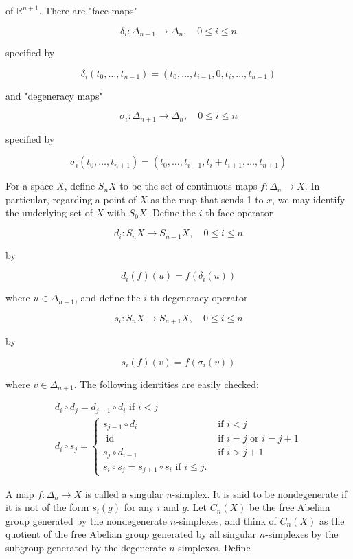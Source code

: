 of $\mathbb{R}^{n+1}$. There are "face maps"

$$
\delta_i: \Delta_{n-1} \longrightarrow \Delta_n, \quad 0 \leq i \leq n
$$

specified by

$$
\delta_i\left(t_0, \ldots, t_{n-1}\right)=\left(t_0, \ldots, t_{i-1}, 0, t_i, \ldots, t_{n-1}\right)
$$

and "degeneracy maps"

$$
\sigma_i: \Delta_{n+1} \longrightarrow \Delta_n, \quad 0 \leq i \leq n
$$

specified by

$$
\sigma_i\left(t_0, \ldots, t_{n+1}\right)=\left(t_0, \ldots, t_{i-1}, t_i+t_{i+1}, \ldots, t_{n+1}\right)
$$


For a space $X$, define $S_n X$ to be the set of continuous maps $f: \Delta_n \longrightarrow X$. In particular, regarding a point of $X$ as the map that sends 1 to $x$, we may identify the underlying set of $X$ with $S_0 X$. Define the $i$ th face operator

$$
d_i: S_n X \longrightarrow S_{n-1} X, \quad 0 \leq i \leq n
$$

by

$$
d_i(f)(u)=f\left(\delta_i(u)\right)
$$

where $u \in \Delta_{n-1}$, and define the $i$ th degeneracy operator

$$
s_i: S_n X \longrightarrow S_{n+1} X, \quad 0 \leq i \leq n
$$

by

$$
s_i(f)(v)=f\left(\sigma_i(v)\right)
$$

where $v \in \Delta_{n+1}$. The following identities are easily checked:

$$
\begin{gathered}
d_i \circ d_j=d_{j-1} \circ d_i \text { if } i<j \\
d_i \circ s_j= \begin{cases}s_{j-1} \circ d_i & \text { if } i<j \\
\text { id } & \text { if } i=j \text { or } i=j+1 \\
s_j \circ d_{i-1} & \text { if } i>j+1 \\
s_i \circ s_j=s_{j+1} \circ s_i \text { if } i \leq j .\end{cases}
\end{gathered}
$$

A map $f: \Delta_n \longrightarrow X$ is called a singular $n$-simplex. It is said to be nondegenerate if it is not of the form $s_i(g)$ for any $i$ and $g$. Let $C_n(X)$ be the free Abelian group generated by the nondegenerate $n$-simplexes, and think of $C_n(X)$ as the quotient of the free Abelian group generated by all singular $n$-simplexes by the subgroup generated by the degenerate $n$-simplexes. Define

